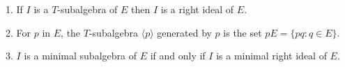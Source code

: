 1. If $I$ is a $T$-subalgebra of $E$ then $I$ is a right ideal of $E$.

2. For $p$ in $E$, the $T$-subalgebra $\langle p \rangle$ generated by $p$ is the set $pE = \{pq : q \in E\}$.

3. $I$ is a minimal subalgebra of $E$ if and only if $I$ is a minimal right ideal of $E$.